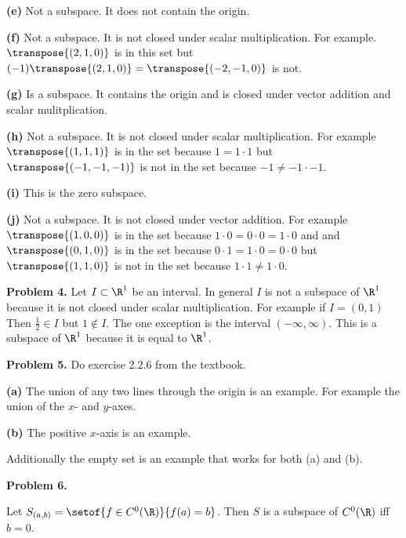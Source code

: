 \documentclass[oneside,12pt]{amsart}
\begin{document}
\smallskip

\textbf{(e)} Not a subspace. It does not contain the origin.

\smallskip

\textbf{(f)} Not a subspace. It is not closed under scalar multiplication.
For example.
$\transpose{(2,1,0)}$ is in this set but $(-1)\transpose{(2,1,0)}=\transpose{(-2,-1,0)}$
is not.

\smallskip

\textbf{(g)} Is a subspace. It contains the origin and is closed under
vector addition and scalar mulitplication.

\smallskip

\textbf{(h)} Not a subspace. It is not closed under scalar multiplication.
For example $\transpose{(1,1,1)}$ is in the set because $1=1\cdot1$ but
$\transpose{(-1,-1,-1)}$ is not in the set because $-1\not=-1\cdot -1$.

\smallskip

\textbf{(i)} This is the zero subspace.

\smallskip

\textbf{(j)} Not a subspace. It is not closed under vector addition. For
example $\transpose{(1,0,0)}$ is in the set
because $1\cdot 0 =  0 \cdot 0 = 1\cdot 0$ and
and $\transpose{(0,1,0)}$ is in the set because $0\cdot 1 = 1\cdot 0 = 0\cdot 0$
but $\transpose{(1,1,0)}$ is not in the set because $1\cdot1 \not= 1\cdot 0$.

\smallskip

\textbf{Problem 4.} Let $I\subset\R^1$ be an interval. In general $I$ is not
a subspace of $\R^1$ because it is not closed under scalar multiplication.
For example if $I=(0,1)$ Then $\frac{1}{2}\in I$ but $1\notin I$. The one exception
is the interval $(-\infty, \infty)$. This is a subspace of $\R^1$ because it
is equal to $\R^1$.

\smallskip

\textbf{Problem 5.} Do exercise 2.2.6 from the textbook.

\smallskip

\textbf{(a)} The union of any two lines through the origin is an example.
For example the union of the $x$- and $y$-axes.

\smallskip

\textbf{(b)} The positive $x$-axis is an example.

\smallskip

Additionally the empty set is an example that works for both (a) and (b).

\smallskip

\textbf{Problem 6.}

Let $S_{(a,b)} = \setof{f\in C^0(\R)}{f(a)=b}$. Then $S$ is a subspace of
$C^0(\R)$ iff $b=0$.
\end{document}

